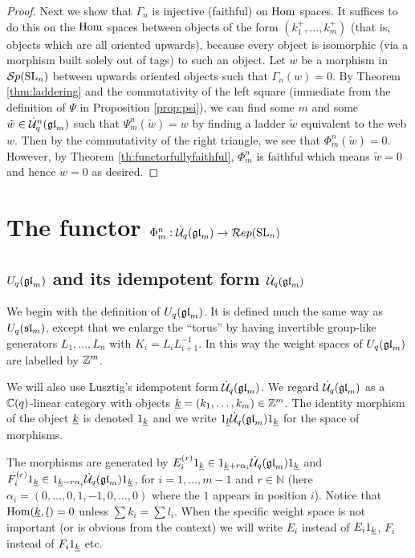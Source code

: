 \documentclass[11pt]{amsart}
\begin{document}
\begin{proof}
Next we show that $ \Gamma_n $ is injective (faithful) on $ \Hom$ spaces. It suffices to do this on the $\Hom$ spaces between objects of the form $(k_1^+,\ldots,k_m^+)$ (that is, objects which are all oriented upwards), because every object is isomorphic (via a morphism built solely out of tags) to such an object.
Let $w$ be a morphism in $ \Sp(\SL_n)$ between upwards oriented objects such that $\Gamma_n(w)=0$.  By Theorem \ref{thm:laddering} and the commutativity of the left square (immediate from the definition of $\Psi$ in Proposition \ref{prop:psi}), we can find some $ m $ and some $\tilde{w} \in \dU^n(\gl_m) $ such that $ \Psi^n_m(\tilde{w}) = w $ by finding a ladder $ \tilde{w} $ equivalent to the web $ w $. Then by the commutativity of the right triangle, we see that $ \Phi^n_m(\tilde{w}) = 0 $.  However, by Theorem \ref{th:functorfullyfaithful}, $\Phi_m^n$ is faithful which means $\tilde{w}=0$ and hence $w=0$ as desired.
\end{proof}

\section{The functor \texorpdfstring{$\Phi_m^n:\dU(\gl_m) \rightarrow \Rep(\SL_n)$}{Phi}}\label{sec:phi}

\subsection{\texorpdfstring{$ U_q(\gl_m)$}{U\_q gl\_m} and its idempotent form \texorpdfstring{$\dU(\gl_m)$}{}}\label{sec:idemform}

We begin with the definition of $ U_q(\gl_m)$.  It is defined much the same way as $ U_q(\sl_m) $, except that we enlarge the ``torus'' by having invertible group-like generators $ L_1, \dots, L_n $ with $ K_i = L_i L_{i+1}^{-1} $.  In this way the weight spaces of $ U_q(\gl_m) $ are labelled by $ \bZ^m $.

We will also use Lusztig's idempotent form $ \dU(\gl_m) $. We regard $\dU(\gl_m)$ as a $\bC(q)$-linear category with objects $ \ul{k} = (k_1, \dots, k_m) \in \mathbb Z^m $.  The identity morphism of the object $\ul{k}$ is denoted $\one_\ul{k}$  and we write $ \one_\ul{l} \dU(\gl_m) \one_\ul{k}$ for the space of morphisms.

The morphisms are generated by $E_i^{(r)} \one_{\ul{k}} \in \one_{\ul{k} + r \alpha_i} \dU(\gl_m) \one_{\ul{k}} $ and $ F_i^{(r)} \one_{\ul{k}} \in \one_{\ul{k} - r \alpha_i} \dU(\gl_m) \one_{\ul{k}}$, for $i=1, \dots, m-1$ and $r \in {\mathbb N}$ (here $\alpha_i = (0,\dots,0,1,-1,0,\dots,0)$ where the $1$ appears in position $i$). Notice that $\Hom(\ul{k}, \ul{l}) = 0 $ unless $\sum k_i = \sum l_i$. When the specific weight space is not important (or is obvious from the context) we will write $E_i$ instead of $E_i \one_{\ul{k}}$, $F_i$ instead of $F_i \one_{\ul{k}}$ etc.
\end{document}
